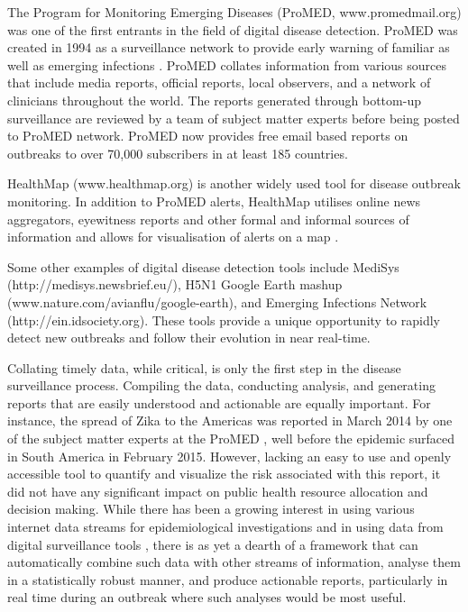 \documentclass[9pt,twocolumn,twoside,lineno]{pnas-new}
\begin{document}
The Program for Monitoring Emerging Diseases (ProMED,
www.promedmail.org) was one of the first entrants in the field of
digital disease detection. ProMED was created in 1994 as a surveillance
network to provide early warning of familiar as well as emerging
infections \cite{morse2012public}. ProMED collates information from
various sources that include media reports, official reports, local
observers, and a network of clinicians throughout the world. The reports
generated through bottom-up surveillance are reviewed by a team of
subject matter experts before being posted to ProMED network. ProMED now
provides free email based reports on outbreaks to over 70,000
subscribers in at least 185 countries.

HealthMap (www.healthmap.org) is another widely used tool for disease
outbreak monitoring. In addition to ProMED alerts, HealthMap utilises
online news aggregators, eyewitness reports and other formal and
informal sources of information and allows for visualisation of alerts
on a map \cite{freifeld2008healthmap}.

Some other examples of digital disease detection tools include MediSys
(http://medisys.newsbrief.eu/), H5N1 Google Earth mashup
(www.nature.com/avianflu/google-earth), and Emerging Infections Network
(http://ein.idsociety.org). These tools provide a unique opportunity to
rapidly detect new outbreaks and follow their evolution in near
real-time.

Collating timely data, while critical, is only the first step in the
disease surveillance process. Compiling the data, conducting analysis,
and generating reports that are easily understood and actionable are
equally important. For instance, the spread of Zika to the Americas was
reported in March 2014 by one of the subject matter experts at the
ProMED \cite{promedzika}, well before the epidemic surfaced in South
America in February 2015. However, lacking an easy to use and openly
accessible tool to quantify and visualize the risk associated with this
report, it did not have any significant impact on public health resource
allocation and decision making. While there has been a growing interest
in using various internet data streams for epidemiological
investigations \cite{generous2014global, milinovich2015role} and
in using data from digital surveillance tools
\cite{chowell2016elucidating}, there is as yet a dearth of a framework
that can automatically combine such data with other streams of
information, analyse them in a statistically robust manner, and produce
actionable reports, particularly in real time during an outbreak where
such analyses would be most useful.
\end{document}
